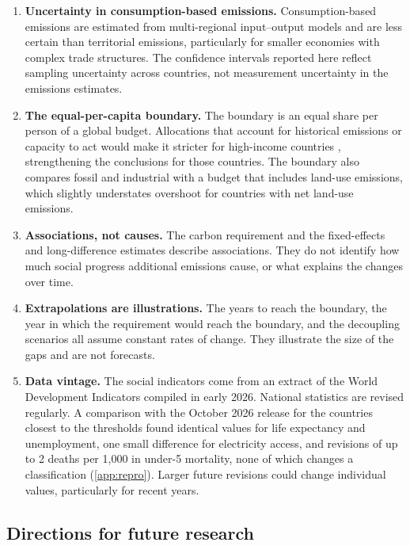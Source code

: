 \begin{enumerate}
\item \textbf{Uncertainty in consumption-based emissions.} Consumption-based emissions are estimated from multi-regional input--output models and are less certain than territorial emissions, particularly for smaller economies with complex trade structures. The confidence intervals reported here reflect sampling uncertainty across countries, not measurement uncertainty in the emissions estimates.

\item \textbf{The equal-per-capita boundary.} The boundary is an equal share per person of a global budget. Allocations that account for historical emissions or capacity to act would make it stricter for high-income countries \citep{hickel2022,haeyhae2016}, strengthening the conclusions for those countries. The boundary also compares fossil and industrial \COtwo{} with a budget that includes land-use emissions, which slightly understates overshoot for countries with net land-use emissions.

\item \textbf{Associations, not causes.} The carbon requirement and the fixed-effects and long-difference estimates describe associations. They do not identify how much social progress additional emissions cause, or what explains the changes over time.

\item \textbf{Extrapolations are illustrations.} The years to reach the boundary, the year in which the requirement would reach the boundary, and the decoupling scenarios all assume constant rates of change. They illustrate the size of the gaps and are not forecasts.

\item \textbf{Data vintage.} The social indicators come from an extract of the World Development Indicators compiled in early 2026. National statistics are revised regularly. A comparison with the October 2026 release for the countries closest to the thresholds found identical values for life expectancy and unemployment, one small difference for electricity access, and revisions of up to 2 deaths per 1{,}000 in under-5 mortality, none of which changes a classification (\cref{app:repro}). Larger future revisions could change individual values, particularly for recent years.
\end{enumerate}

\subsection{Directions for future research}

